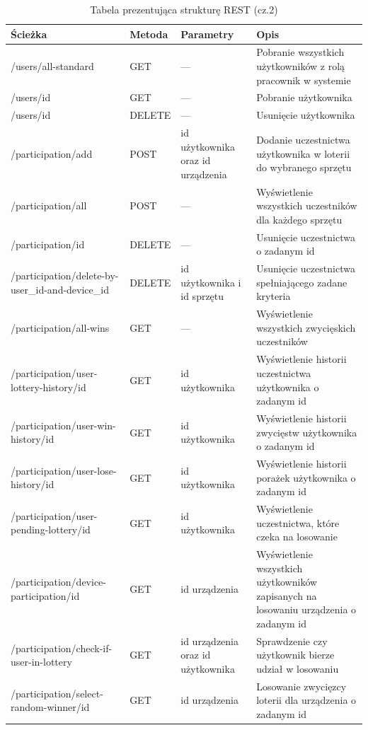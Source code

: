 \begin{table}[H] \small
	\centering
\caption{Tabela prezentująca strukturę REST (cz.2)}
\label{tab:rest2}	 
\begin{tabularx}{\linewidth}{|X|l|p{3cm}|X|}\hline
    Ścieżka & Metoda & Parametry & Opis  \\
    \hline \hline
		 /users/all-standard	& GET & --- & Pobranie wszystkich użytkowników z rolą pracownik w systemie\\
		\hline
		 /users/id & GET & --- & Pobranie użytkownika\\
		\hline
		 /users/id & DELETE & --- & Usunięcie użytkownika\\
		\hline
		 /participation/add & POST & id użytkownika oraz id urządzenia & Dodanie uczestnictwa użytkownika w loterii do wybranego sprzętu\\
		\hline
		 /participation/all& POST & --- & Wyświetlenie wszystkich uczestników dla każdego sprzętu\\
		\hline
		 /participation/id & DELETE & --- & Usunięcie uczestnictwa o zadanym id\\
		\hline
		 /participation/delete-by-user\_id-and-device\_id& DELETE & id użytkownika i id sprzętu & Usunięcie uczestnictwa spełniającego zadane kryteria\\
		\hline
		 /participation/all-wins& GET & --- & Wyświetlenie wszystkich zwycięskich uczestników\\
		\hline
		 /participation/user-lottery-history/id & GET& id użytkownika & Wyświetlenie historii uczestnictwa użytkownika o zadanym id\\
		\hline
		 /participation/user-win-history/id & GET& id użytkownika & Wyświetlenie historii zwycięstw użytkownika o zadanym id\\
		\hline
		 /participation/user-lose-history/id & GET& id użytkownika & Wyświetlenie historii porażek użytkownika o zadanym id\\
		\hline
		 /participation/user-pending-lottery/id & GET& id użytkownika & Wyświetlenie uczestnictwa, które czeka na losowanie\\
		\hline
		 /participation/device-participation/id& GET& id urządzenia & Wyświetlenie wszystkich użytkowników zapisanych na losowaniu urządzenia o zadanym id\\
		\hline
		 /participation/check-if-user-in-lottery& GET& id urządzenia oraz id użytkownika& Sprawdzenie czy użytkownik bierze udział w losowaniu\\
		\hline
		 /participation/select-random-winner/id& GET& id urządzenia& Losowanie zwycięzcy loterii dla urządzenia o zadanym id\\
		\hline
\end{tabularx}
\end{table}



